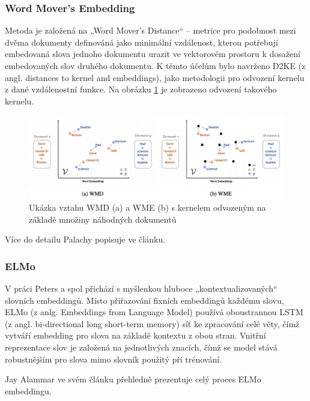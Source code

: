\documentclass[thesis=M,czech]{FITthesis}[2019/12/23]
\begin{document}
\subsubsection{Word Mover's Embedding}
Metoda je založená na „Word Mover’s Distance“\cite{kusner2015} -- metrice pro podobnost mezi dvěma dokumenty definováná jako minimální vzdálenost, kterou potřebují embedovaná slova jednoho dokumentu urazit ve vektorovém prostoru k dosažení embedovaných slov druhého dokumentu. K těmto účelům bylo navrženo D2KE (z angl. distances to kernel and embeddings)\cite{wu2018}, jako metodologii pro odvození kernelu z dané vzdálenostní funkce. Na obrázku \ref{fig:palachy2019WME} je zobrazeno odvození takového kernelu.
\begin{figure}\centering
	\includegraphics[width=\textwidth]{images/palachy2019/palachy2019_WME.png}
	\caption{Ukázka vztahu WMD (a) a WME (b) s kernelem odvozeným na základě množiny náhodných dokumentů\cite{palachy2019}}\label{fig:palachy2019WME}
\end{figure}

Více do detailu Palachy popisuje ve článku\cite{palachy2019}.

\subsubsection{ELMo}
V práci Peters a spol\cite{peters2018} přichází s myšlenkou hluboce „kontextualizovaných“ slovních embeddingů. Místo přiřazování fixních embeddingů každému slovu, ELMo (z anlg. Embeddings from Language Model) používá oboustrannou LSTM (z angl. bi-directional long short-term memory) síť ke zpracování celé věty, čímž vytváří embedding pro slova na základě kontextu z obou stran. Vnitřní reprezentace slov je založená na jednotlivých znacích, čímž se model stává robustnějším pro slova mimo slovník použitý při trénování.

Jay Alammar ve svém článku\cite{alammar2018} přehledně prezentuje celý proces ELMo embeddingu.
\end{document}
